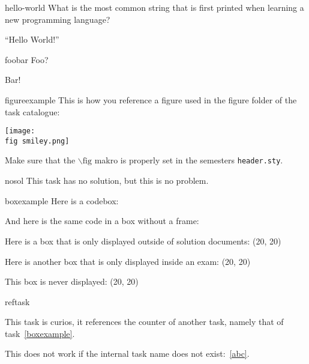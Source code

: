 
\begin{task}{hello-world}
What is the most common string that is first printed when learning a new programming language?
    
\solution

``Hello World!''
\end{task}



\begin{task}{foobar}
Foo?
    
\solution

Bar!
\end{task}



\begin{task}{figureexample}
This is how you reference a figure used in the figure folder of the task catalogue:

\centerline{\texttt{[image: \\fig smiley.png]}}

Make sure that the $\backslash \text{fig}$ makro is properly set in the semesters \verb!header.sty!.
\end{task}



\begin{task}{nosol}
This task has no solution, but this is no problem.
\end{task}



\begin{task}{boxexample}
Here is a codebox:


And here is the same code in a box without a frame:


Here is a box that is only displayed outside of solution documents: \Box(20, 20)

Here is another box that is only displayed inside an exam: \KBox(20, 20)

\solution

This box is never displayed: \Box(20, 20)

\end{task}



\begin{task}{reftask}

This task is curios, it references the counter of another task, namely that of
task~\ref{boxexample}.

\solution

This does not work if the internal task name does not exist:~\ref{abc}.

\end{task}